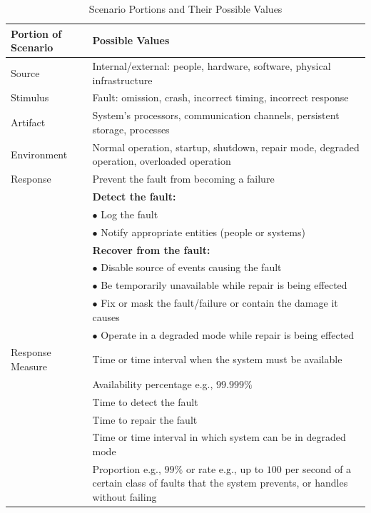\begin{LTR}
    \begin{table}[H]
        \centering
        \begin{tabular}{|>{\raggedright\arraybackslash}p{}|>{\raggedright\arraybackslash}p{}|}
            \hline
            \textbf{Portion of Scenario} & \textbf{Possible Values} \\
            \hline
            Source & Internal/external: people, hardware, software, physical infrastructure \\
            \hline
            Stimulus & Fault: omission, crash, incorrect timing, incorrect response \\
            \hline
            Artifact & System’s processors, communication channels, persistent storage, processes \\
            \hline
            Environment & Normal operation, startup, shutdown, repair mode, degraded operation, overloaded operation \\
            \hline
            Response & Prevent the fault from becoming a failure \\
            & \textbf{Detect the fault:} \\
            & \quad $\bullet$ Log the fault \\
            & \quad $\bullet$ Notify appropriate entities (people or systems) \\
            & \textbf{Recover from the fault:} \\
            & \quad $\bullet$ Disable source of events causing the fault \\
            & \quad $\bullet$ Be temporarily unavailable while repair is being effected \\
            & \quad $\bullet$ Fix or mask the fault/failure or contain the damage it causes \\
            & \quad $\bullet$ Operate in a degraded mode while repair is being effected \\
            \hline
            Response Measure & Time or time interval when the system must be available \\
            & Availability percentage e.g., $99.999\%$ \\
            & Time to detect the fault \\
            & Time to repair the fault \\
            & Time or time interval in which system can be in degraded mode \\
            & Proportion e.g., $99\%$ or rate e.g., up to $100$ per second of a certain class of faults that the system prevents, or handles without failing \\
            \hline
        \end{tabular}
        \caption{Scenario Portions and Their Possible Values}
        \label{tab:scenario-possible-values}
    \end{table}
\end{LTR}

